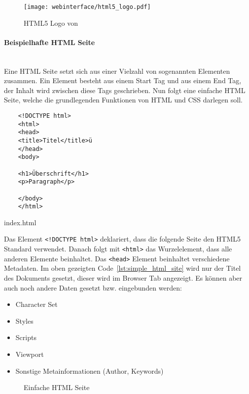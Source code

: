 \begin{figure}[H]
  \centering
  \texttt{[image: webinterface/html5\_logo.pdf]}
  \caption{HTML5 Logo von }
\end{figure}

\paragraph{Beispielhafte HTML Seite}\mbox{}\\
Eine \acs*{HTML} Seite setzt sich aus einer Vielzahl von sogenannten Elementen
zusammen. Ein Element besteht aus einem Start Tag und aus einem End Tag, der
Inhalt wird zwischen diese Tags geschrieben. Nun folgt eine einfache HTML Seite,
welche die grundlegenden Funktionen von HTML und CSS darlegen soll.

\begin{listing}[H]
  \begin{verbatim}
    <!DOCTYPE html>
    <html>
    <head>
    <title>Titel</title>ü
    </head>
    <body>

    <h1>Überschrift</h1>
    <p>Paragraph</p>

    </body>
    </html>
  \end{verbatim}
  \caption{index.html}
  \label{lst:simple_html_site}
\end{listing}

Das Element \verb|<!DOCTYPE html>| deklariert, dass die folgende Seite den HTML5
Standard verwendet. Danach folgt mit \verb|<html>| das Wurzelelement, dass alle
anderen Elemente beinhaltet. Das \verb|<head>| Element beinhaltet verschiedene
Metadaten. Im oben gezeigten Code~\ref{lst:simple_html_site} wird nur der Titel
des Dokuments gesetzt, dieser wird im Browser Tab angezeigt. Es können aber auch
noch andere Daten gesetzt bzw. eingebunden werden:

\begin{itemize}
  \item Character Set
  \item Styles
  \item Scripts
  \item Viewport
  \item Sonstige Metainformationen (Author, Keywords)
\end{itemize}

\begin{figure}[H]
  \centering
  \caption{Einfache HTML Seite}
  \label{fig:simple_html_page}
\end{figure}

